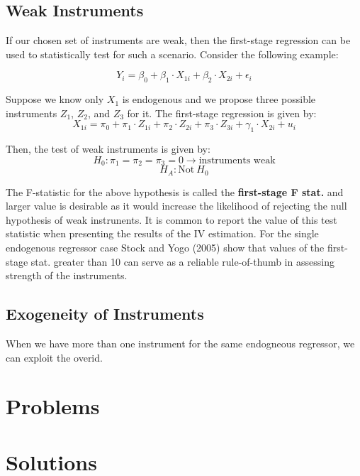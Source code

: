 \documentclass[
]{book}
\theoremstyle{definition}
\theoremstyle{definition}
\theoremstyle{definition}
\theoremstyle{definition}
\theoremstyle{remark}
\begin{document}
\hypertarget{weak-instruments}{%
\subsection{Weak Instruments}\label{weak-instruments}}

If our chosen set of instruments are weak, then the first-stage regression can be used to statistically test for such a scenario. Consider the following example:

\[Y_i=\beta_0+\beta_1\cdot X_{1i}+\beta_2 \cdot X_{2i}+\epsilon_i \]

Suppose we know only \(X_1\) is endogenous and we propose three possible instruments \(Z_1\), \(Z_2\), and \(Z_3\) for it. The first-stage regression is given by:
\[X_{1i}=\pi_0+\pi_1\cdot Z_{1i}+\pi_2 \cdot Z_{2i} + \pi_3 \cdot Z_{3i} +\gamma_1 \cdot X_{2i}+u_i\]

Then, the test of weak instruments is given by:
\[H_0: \pi_1=\pi_2=\pi_3=0 \rightarrow \text{instruments weak}\]
\[H_A: \text{Not} \ H_0\]

The F-statistic for the above hypothesis is called the \textbf{first-stage F stat.} and larger value is desirable as it would increase the likelihood of rejecting the null hypothesis of weak instrunents. It is common to report the value of this test statistic when presenting the results of the IV estimation. For the single endogenous regressor case Stock and Yogo (2005) show that values of the first-stage stat. greater than 10 can serve as a reliable rule-of-thumb in assessing strength of the instruments.

\hypertarget{exogeneity-of-instruments}{%
\subsection{Exogeneity of Instruments}\label{exogeneity-of-instruments}}

When we have more than one instrument for the same endogneous regressor, we can exploit the overid.

\hypertarget{problems-4}{%
\section*{Problems}\label{problems-4}}

\hypertarget{solutions-4}{%
\section*{Solutions}\label{solutions-4}}
\end{document}
